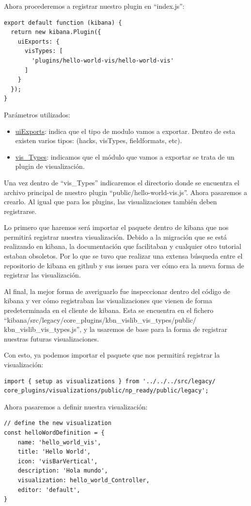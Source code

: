 \documentclass[a4paper, 12pt]{book}
\begin{document}
Ahora procederemos a registrar nuestro plugin en “index.js”:

\begin{lstlisting}[frame=single]
export default function (kibana) {
  return new kibana.Plugin({
    uiExports: {
      visTypes: [
        'plugins/hello-world-vis/hello-world-vis'
      ]
    }
  });
}
\end{lstlisting}

Parámetros utilizados:
\begin{itemize}
    \item \underline{uiExports}: indica que el tipo de modulo vamos a exportar. Dentro de esta existen varios tipos: (hacks, visTypes, fieldformats, etc).
    \item \underline{vis\_Types}: indicamos que el módulo que vamos a exportar se trata de un plugin de visualización.
\end{itemize}

Una vez dentro de “vis\_Types” indicaremos el directorio donde se encuentra el archivo principal de nuestro plugin “public/hello-world-vis.js”. Ahora pasaremos a crearlo. Al igual que para los plugins, las visualizaciones también deben registrarse. 

Lo primero que haremos será importar el paquete dentro de kibana que nos permitirá registrar nuestra visualización. Debido a la migración que se está realizando en kibana, la documentación que facilitaban y cualquier otro tutorial estaban obsoletos. Por lo que se tuvo que realizar una extensa búsqueda entre el repositorio de kibana en github y sus issues para ver cómo era la nueva forma de registrar las visualización. 

Al final, la mejor forma de averiguarlo fue inspeccionar dentro del código de kibana y ver cómo registraban las visualizaciones que vienen de forma predeterminada en el cliente de kibana. Esta se encuentra en el fichero “kibana/src/legacy/core\_plugins/kbn\_vislib\_vis\_types/public/ kbn\_vislib\_vis\_types.js”, y la usaremos de base para la forma de registrar nuestras futuras visualizaciones.

Con esto, ya podemos importar el paquete que nos permitirá registrar la visualización:

\begin{lstlisting}[frame=single]
import { setup as visualizations } from '../../../src/legacy/
core_plugins/visualizations/public/np_ready/public/legacy';
\end{lstlisting}

Ahora pasaremos a definir nuestra visualización:
\begin{lstlisting}[frame=single]
// define the new visualization
const helloWordDefinition = {
    name: 'hello_world_vis',
    title: 'Hello World',
    icon: 'visBarVertical',
    description: 'Hola mundo',
    visualization: hello_world_Controller,
    editor: 'default',
}
\end{lstlisting}
\end{document}
